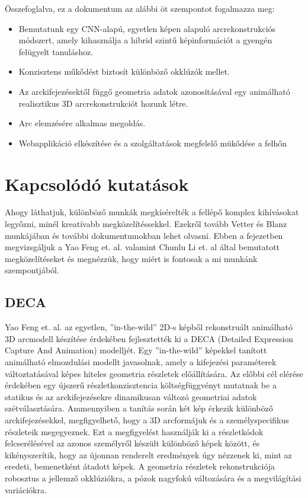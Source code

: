 \documentclass[12pt,a4]{article}
\begin{document}
Összefoglalva, ez a dokumentum az alábbi öt szempontot fogalmazza meg:
\begin{itemize}
	 \item Bemutatunk egy CNN-alapú, egyetlen képen alapuló arcrekonstrukciós módszert, amely kihasználja a hibrid szintű képinformációt a gyengén felügyelt tanuláshoz.
	 \item Konzisztens műkődést biztosít különböző okklúzók mellet.
	 \item Az arckifejezésektől függő geometria adatok azonosításával egy animálható realisztikus 3D arcrekonstrukciót hozunk létre.
	 \item Arc elemzésére alkalmas megoldás.
	 \item Webapplikáció elkészítése és a szolgáltatások megfelelő mükődése a felhőn
\end{itemize}

 
\section{Kapcsolódó kutatások}
 	
    Ahogy láthatjuk, különböző munkák megkísérelték a fellépő komplex kihívásokat legyőzni, minél kreatívabb megközelítéssekkel. Ezekről tovább Vetter és Blanz \cite{blanzvetter} munkájában és további dokumentumokban lehet olvasni. Ebben a fejezetben megvizsgáljuk a Yao Feng et. al. \cite{deca} valamint Chunlu Li et. al \cite{focus} által bemutatott megközelítéseket és megnézzük, hogy miért is fontosak a mi munkánk szempontjából.
 	
 	\subsection{DECA}
 	
    Yao Feng et. al.\cite{deca} az egyetlen, ”in-the-wild” 2D-s képből rekonstruált animálható 3D arcmodell készítése érdekében fejlesztették ki a DECA (Detailed Expression Capture And Animation) modelljét. Egy ”in-the-wild” képekkel tanított animálható elmozdulási modellt javasolnak, amely a kifejezési paraméterek változtatásával képes hiteles geometria részletek előállítására. Az előbbi cél elérése érdekében egy újszerű részletkonzisztencia költségfüggvényt mutatnak be a statikus és az arckifejezésekre dinamikusan változó geometriai adatok szétválasztására. Ammennyiben a tanítás során két kép érkezik különböző arckifejezésekkel, megfigyelhető, hogy a 3D arcformájuk és a személyspecifikus részleteik megegyeznek. Ezt a megfigyelést használják ki a részletkódok felcserélésével az azonos személyről készült különböző képek között, és kikényszerítik, hogy az újonnan renderelt eredmények úgy nézzenek ki, mint az eredeti, bemenetként átadott képek. A geometria részletek rekonstrukciója robosztus a jellemző okklúziókra, a pózok nagyfokú változására és a megvilágítási variációkra.
 	
\end{document}

